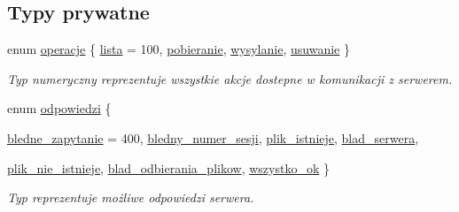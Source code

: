 \subsection*{Typy prywatne}
\begin{CompactItemize}
\item 
enum \hyperlink{a00013_bdaf61f2216998b5bed708a9013fcaa2}{operacje} \{ \hyperlink{a00013_bdaf61f2216998b5bed708a9013fcaa2}{lista} =  100, 
\hyperlink{a00013_bdaf61f2216998b5bed708a9013fcaa2}{pobieranie}, 
\hyperlink{a00013_bdaf61f2216998b5bed708a9013fcaa2}{wysylanie}, 
\hyperlink{a00013_bdaf61f2216998b5bed708a9013fcaa2}{usuwanie}
 \}
\begin{CompactList}\small\item\em Typ numeryczny reprezentuje wszystkie akcje dostepne w komunikacji z serwerem. \item\end{CompactList}\item 
enum \hyperlink{a00013_269bf72dbaab617daf62394689014af9}{odpowiedzi} \{ \par
\hyperlink{a00013_269bf72dbaab617daf62394689014af9}{bledne\_\-zapytanie} =  400, 
\hyperlink{a00013_269bf72dbaab617daf62394689014af9}{bledny\_\-numer\_\-sesji}, 
\hyperlink{a00013_269bf72dbaab617daf62394689014af9}{plik\_\-istnieje}, 
\hyperlink{a00013_269bf72dbaab617daf62394689014af9}{blad\_\-serwera}, 
\par
\hyperlink{a00013_269bf72dbaab617daf62394689014af9}{plik\_\-nie\_\-istnieje}, 
\hyperlink{a00013_269bf72dbaab617daf62394689014af9}{blad\_\-odbierania\_\-plikow}, 
\hyperlink{a00013_269bf72dbaab617daf62394689014af9}{wszystko\_\-ok}
 \}
\begin{CompactList}\small\item\em Typ reprezentuje możliwe odpowiedzi serwera. \item\end{CompactList}\end{CompactItemize}
